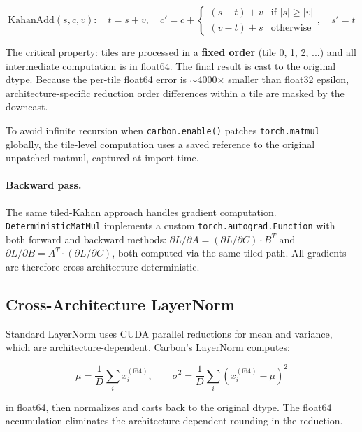 \documentclass[11pt,a4paper]{article}
\begin{document}
\begin{equation}
  \text{KahanAdd}(s, c, v): \quad t = s + v, \quad
  c' = c + \begin{cases}
    (s - t) + v & \text{if } |s| \geq |v| \\
    (v - t) + s & \text{otherwise}
  \end{cases}, \quad
  s' = t
\end{equation}

The critical property: tiles are processed in a \textbf{fixed order}
(tile 0, 1, 2, ...) and all intermediate computation is in float64.
The final result is cast to the original dtype. Because the per-tile
float64 error is $\sim$4000$\times$ smaller than float32 epsilon,
architecture-specific reduction order differences within a tile are
masked by the downcast.

To avoid infinite recursion when \texttt{carbon.enable()} patches
\texttt{torch.matmul} globally, the tile-level computation uses a saved
reference to the original unpatched matmul, captured at import time.

\paragraph{Backward pass.} The same tiled-Kahan approach handles gradient
computation. \texttt{DeterministicMatMul} implements a custom
\texttt{torch.autograd.Function} with both forward and backward methods:
$\partial L / \partial A = (\partial L / \partial C) \cdot B^T$ and
$\partial L / \partial B = A^T \cdot (\partial L / \partial C)$, both
computed via the same tiled path. All gradients are therefore
cross-architecture deterministic.

\subsection{Cross-Architecture LayerNorm}

Standard LayerNorm uses CUDA parallel reductions for mean and variance,
which are architecture-dependent. Carbon's LayerNorm computes:

\begin{equation}
  \mu = \frac{1}{D}\sum_{i} x_i^{(\text{f64})}, \qquad
  \sigma^2 = \frac{1}{D}\sum_{i} (x_i^{(\text{f64})} - \mu)^2
\end{equation}

in float64, then normalizes and casts back to the original dtype. The
float64 accumulation eliminates the architecture-dependent rounding in
the reduction.
\end{document}

